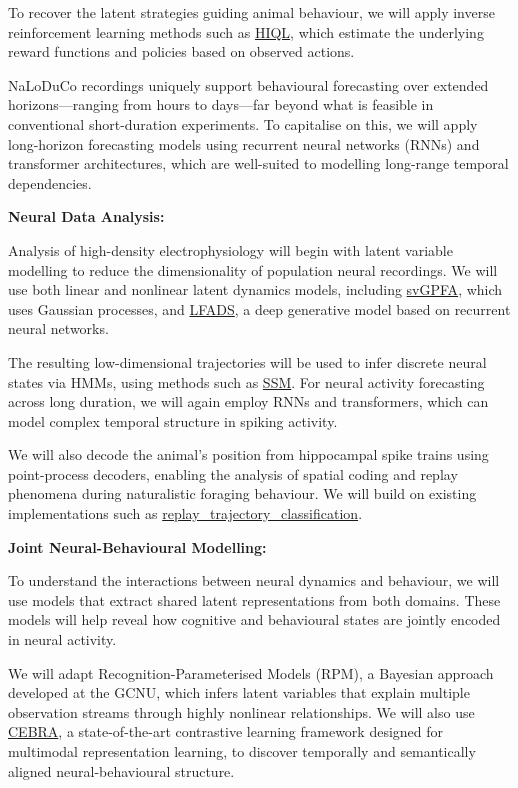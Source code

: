 To recover the latent strategies guiding animal behaviour, we will apply
inverse reinforcement learning methods such as
\href{https://github.com/haozhu10015/hiql}{HIQL}, which estimate the underlying
reward functions and policies based on observed actions.

NaLoDuCo recordings uniquely support behavioural forecasting over extended
horizons—ranging from hours to days—far beyond what is feasible in conventional
short-duration experiments. To capitalise on this, we will apply long-horizon
forecasting models using recurrent neural networks (RNNs) and transformer
architectures, which are well-suited to modelling long-range temporal
dependencies.

\vspace{1em}
\noindent\textbf{Neural Data Analysis:}

Analysis of high-density electrophysiology will begin with latent variable
modelling to reduce the dimensionality of population neural recordings. We will
use both linear and nonlinear latent dynamics models, including
\href{https://github.com/joacorapela/svGPFA}{svGPFA}, which uses Gaussian
processes, and \href{https://snel.ai/resources/lfads/}{LFADS}, a deep
generative model based on recurrent neural networks.

The resulting low-dimensional trajectories will be used to infer discrete
neural states via HMMs, using methods such as
\href{https://github.com/lindermanlab/ssm}{SSM}. For neural activity
forecasting across long duration, we will again employ RNNs and transformers,
which can model complex temporal structure in spiking activity.

We will also decode the animal’s position from hippocampal spike trains using
point-process decoders, enabling the analysis of spatial coding and replay
phenomena during naturalistic foraging behaviour. We will build on existing
implementations such as
\href{https://github.com/Eden-Kramer-Lab/replay_trajectory_classification}{replay\_trajectory\_classification}.

\vspace{1em}
\noindent\textbf{Joint Neural-Behavioural Modelling:}  

To understand the interactions between neural dynamics and behaviour, we will
use models that extract shared latent representations from both domains. These
models will help reveal how cognitive and behavioural states are jointly
encoded in neural activity.

We will adapt Recognition-Parameterised Models (RPM), a Bayesian approach
developed at the GCNU, which infers latent variables that explain multiple
observation streams through highly nonlinear relationships. We will also use
\href{https://cebra.ai/}{CEBRA}, a state-of-the-art contrastive learning
framework designed for multimodal representation learning, to discover
temporally and semantically aligned neural-behavioural structure.


